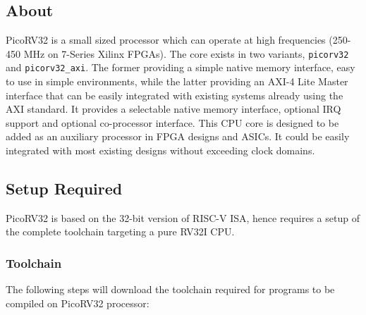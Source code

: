 \subsection{About}
 \label{sect6_3_1}
PicoRV32 is a small sized processor which can operate at high frequencies (250-450 MHz on 7-Series Xilinx FPGAs). The core exists in two variants, \verb|picorv32| and \verb|picorv32_axi|. The former providing a simple native memory interface, easy to use in simple environments, while the latter providing an AXI-4 Lite Master interface that can be easily integrated with existing systems already using the AXI standard. It provides a selectable native memory interface, optional IRQ support and optional co-processor interface. This CPU core is designed to be added as an auxiliary processor in FPGA designs and ASICs. It could be easily integrated with most existing designs without exceeding clock domains. 

\subsection{Setup Required}
 \label{sect6_3_2}
PicoRV32 is based on the 32-bit version of RISC-V ISA, hence requires a setup of the complete toolchain targeting a pure RV32I CPU. 

\subsubsection{Toolchain}
 \label{sect6_3_2_1}
The following steps will download the toolchain required for programs to be compiled on PicoRV32 processor:

